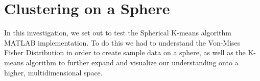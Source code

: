 \documentclass[../tech_report_1.tex]{subfiles}
\begin{document}
\part{Clustering on a Sphere}
In this investigation, we set out to test the Spherical K-means algorithm MATLAB implementation. To do this we had to understand the Von-Mises Fisher Distribution in order to create sample data on a sphere, as well as the K-means algorithm to further expand and visualize our understanding onto a higher, multidimensional space.
\end{document}
